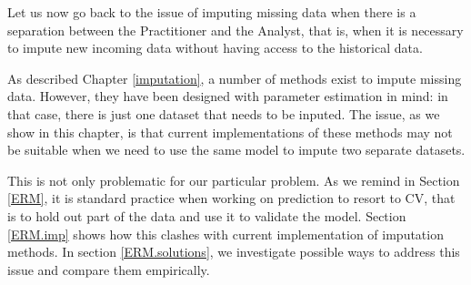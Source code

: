 Let us now go back to the issue of imputing missing data when there is a separation between the Practitioner and the Analyst, that is, when it is necessary to impute new incoming data without having access to the historical data.

As described Chapter \ref{imputation}, a number of methods exist to impute missing data. However, they have been designed with parameter estimation in mind: in that case, there is just one dataset that needs to be inputed. The issue, as we show in this chapter, is that current implementations of these methods may not be suitable when we need to use the same model to impute two separate datasets.

This is not only problematic for our particular problem. As we remind in Section \ref{ERM}, it is standard practice when working on prediction to resort to CV, that is to hold out part of the data and use it to validate the model. Section \ref{ERM.imp} shows how this clashes with current implementation of imputation methods. In section \ref{ERM.solutions}, we investigate possible ways to address this issue and compare them empirically.



